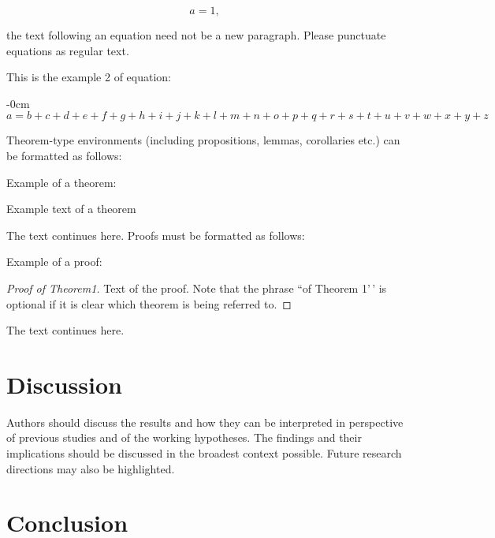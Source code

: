 \documentclass[notspecified,article,submit,moreauthors,pdftex]{Definitions/mdpi}
\begin{document}
\begin{equation}
a = 1,
\end{equation}

the text following an equation need not be a new paragraph. Please
punctuate equations as regular text.

This is the example 2 of equation:

\begin{adjustwidth}{-\extralength}{0cm}
\begin{equation}
a = b + c + d + e + f + g + h + i + j + k + l + m + n + o + p + q + r + s + t + 
u + v + w + x + y + z
\end{equation}
\end{adjustwidth}

Theorem-type environments (including propositions, lemmas, corollaries
etc.) can be formatted as follows:

Example of a theorem:

\begin{Theorem}
Example text of a theorem

\end{Theorem}

The text continues here. Proofs must be formatted as follows:

Example of a proof:

\begin{proof}[Proof of Theorem1]
Text of the proof. Note that the phrase ``of Theorem 1'\,' is optional
if it is clear which theorem is being referred to.

\end{proof}

The text continues here.

\hypertarget{discussion}{%
\section{Discussion}\label{discussion}}

Authors should discuss the results and how they can be interpreted in
perspective of previous studies and of the working hypotheses. The
findings and their implications should be discussed in the broadest
context possible. Future research directions may also be highlighted.

\hypertarget{conclusion}{%
\section{Conclusion}\label{conclusion}}
\end{document}
